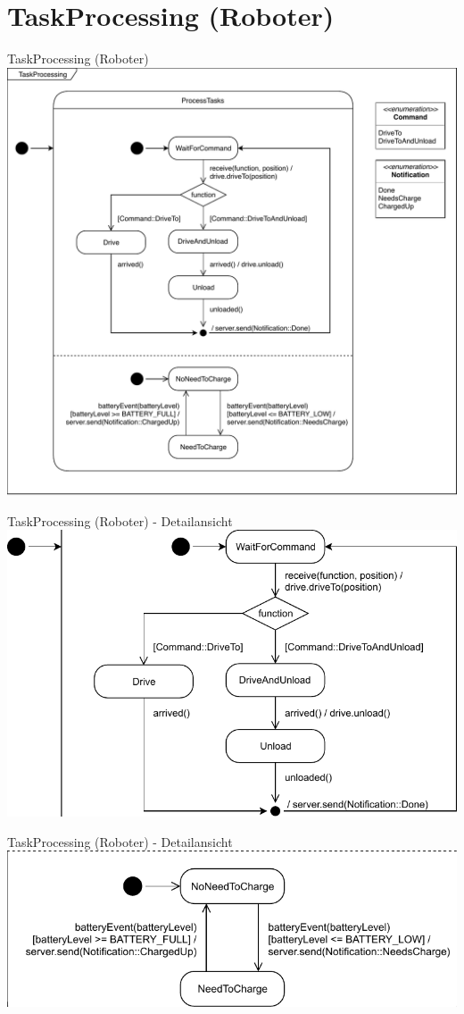 \documentclass{beamer}
\begin{document}
	\section{TaskProcessing (Roboter)}
	\begin{frame}{TaskProcessing (Roboter)}
	\centering
	\includegraphics[height=0.75\textheight]{PDF/TaskProcessing.pdf}
	\end{frame}
\begin{frame}{TaskProcessing (Roboter) - Detailansicht}
\centering
\includegraphics[width=0.8\linewidth]{PDF/TaskProcessing1.pdf}
\end{frame}
\begin{frame}{TaskProcessing (Roboter) - Detailansicht}
\centering
\includegraphics[width=\linewidth]{PDF/TaskProcessing2.pdf}
\end{frame}
\end{document}
